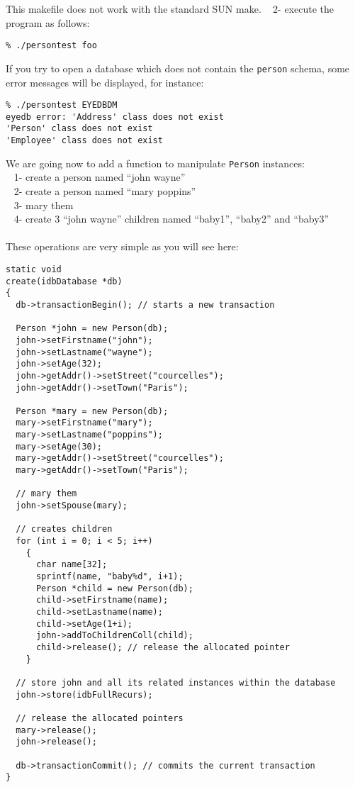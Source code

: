This makefile does not work with the standard SUN make.
\mbox{ } 2- execute the program as follows:
\verbsize \begin{verbatim}
% ./persontest foo
\end{verbatim}
\normalsize
If you try to open a database which does not contain the \texttt{person} schema,
some error messages will be displayed, for instance:
\verbsize \begin{verbatim}
% ./persontest EYEDBDM
eyedb error: 'Address' class does not exist
'Person' class does not exist
'Employee' class does not exist
\end{verbatim}
\normalsize
We are going now to add a function to manipulate \texttt{Person} instances:\\
\mbox{ } 1- create a person named ``john wayne''\\
\mbox{ } 2- create a person named ``mary poppins''\\
\mbox{ } 3- mary them\\
\mbox{ } 4- create 3 ``john wayne'' children named ``baby1'', ``baby2'' and
``baby3''\\
\\
These operations are very simple as you will see here:
\verbsize \begin{verbatim}
static void
create(idbDatabase *db)
{
  db->transactionBegin(); // starts a new transaction

  Person *john = new Person(db);
  john->setFirstname("john");
  john->setLastname("wayne");
  john->setAge(32);
  john->getAddr()->setStreet("courcelles");
  john->getAddr()->setTown("Paris");

  Person *mary = new Person(db);
  mary->setFirstname("mary");
  mary->setLastname("poppins");
  mary->setAge(30);
  mary->getAddr()->setStreet("courcelles");
  mary->getAddr()->setTown("Paris");

  // mary them
  john->setSpouse(mary);

  // creates children
  for (int i = 0; i < 5; i++)
    {
      char name[32];
      sprintf(name, "baby%
      Person *child = new Person(db);
      child->setFirstname(name);
      child->setLastname(name);
      child->setAge(1+i);
      john->addToChildrenColl(child);
      child->release(); // release the allocated pointer
    }

  // store john and all its related instances within the database
  john->store(idbFullRecurs);

  // release the allocated pointers
  mary->release();
  john->release();

  db->transactionCommit(); // commits the current transaction
}
\end{verbatim}
